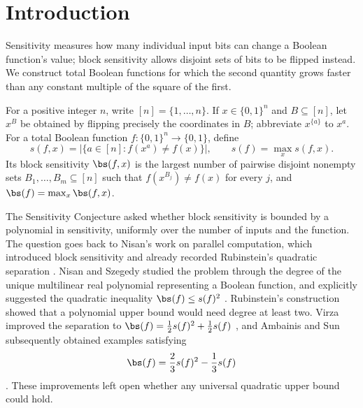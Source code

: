 \begin{abstract}
We disprove the quadratic strengthening of the Sensitivity Conjecture by
constructing nonconstant total Boolean functions whose block sensitivity grows
faster than any constant multiple of sensitivity squared. In fact, for some
fixed \(\alpha>2\), our examples have unbounded block sensitivity and satisfy
\(\bs(f)\ge s(f)^\alpha\).
\end{abstract}
\section{Introduction}
\label{sec:introduction}

Sensitivity measures how many individual input bits can change a Boolean
function's value; block sensitivity allows disjoint sets of bits to be
flipped instead. We construct total Boolean functions for which the second
quantity grows faster than any constant multiple of the square of the first.

For a positive integer \(n\), write \([n]=\{1,\ldots,n\}\).
If \(x\in\{0,1\}^n\) and \(B\subseteq[n]\), let \(x^B\) be obtained
by flipping precisely the coordinates in \(B\); abbreviate
\(x^{\{a\}}\) to \(x^a\).
For a total Boolean function \(f:\{0,1\}^n\to\{0,1\}\), define
\[
 s(f,x)=\bigl|\{a\in[n]:f(x^a)\ne f(x)\}\bigr|,
 \qquad s(f)=\max_x s(f,x).
\]
Its block sensitivity \(\bs(f,x)\) is the largest number of pairwise
disjoint nonempty sets \(B_1,\ldots,B_m\subseteq[n]\) such that
\(f(x^{B_j})\ne f(x)\) for every \(j\), and
\(\bs(f)=\max_x\bs(f,x)\).

The Sensitivity Conjecture asked whether block sensitivity is bounded by a
polynomial in sensitivity, uniformly over the number of inputs and the
function. The question goes back to Nisan's work on parallel computation,
which introduced block sensitivity and already recorded Rubinstein's
quadratic separation \cite[Section~2]{Nisan1989}.
Nisan and Szegedy studied the problem through the degree of the unique
multilinear real polynomial representing a Boolean function, and explicitly
suggested the quadratic inequality \(\bs(f)\le s(f)^2\)
\cite[Section~4]{NisanSzegedy1994}.
Rubinstein's construction \cite{Rubinstein1995} showed that a polynomial
upper bound would need degree at least two. Virza improved the separation
to \(\bs(f)=\tfrac12s(f)^2+\tfrac12s(f)\) \cite{Virza2011}, and
Ambainis and Sun subsequently obtained examples satisfying
\[
 \bs(f)=\frac23s(f)^2-\frac13s(f)
\]
\cite[Theorem~1]{AmbainisSun2011}.
These improvements left open whether any universal quadratic upper bound
could hold.

